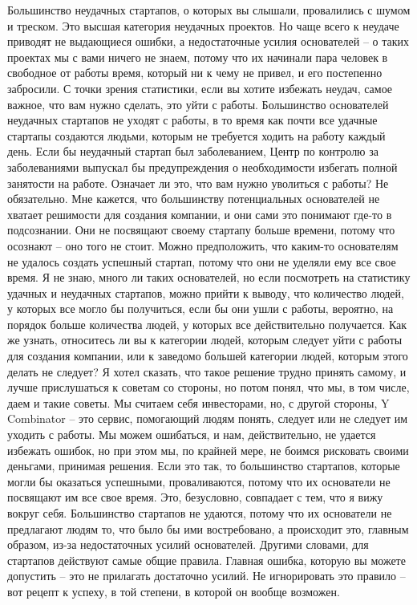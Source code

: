 \documentclass[ebook,12pt,oneside,openany]{memoir}
\begin{document}
Большинство неудачных стартапов, о которых вы слышали, провалились с
шумом и треском. Это высшая категория неудачных проектов. Но чаще
всего к неудаче приводят не выдающиеся ошибки, а недостаточные усилия
основателей – о таких проектах мы с вами ничего не знаем, потому что
их начинали пара человек в свободное от работы время, который ни к
чему не привел, и его постепенно забросили. С точки зрения статистики,
если вы хотите избежать неудач, самое важное, что вам нужно сделать,
это уйти с работы. Большинство основателей неудачных стартапов не
уходят с работы, в то время как почти все удачные стартапы создаются
людьми, которым не требуется ходить на работу каждый день. Если бы
неудачный стартап был заболеванием, Центр по контролю за заболеваниями
выпускал бы предупреждения о необходимости избегать полной занятости
на работе. Означает ли это, что вам нужно уволиться с работы? Не
обязательно. Мне кажется, что большинству потенциальных основателей не
хватает решимости для создания компании, и они сами это понимают
где-то в подсознании. Они не посвящают своему стартапу больше времени,
потому что осознают – оно того не стоит. Можно предположить, что
каким-то основателям не удалось создать успешный стартап, потому что
они не уделяли ему все свое время. Я не знаю, много ли таких
основателей, но если посмотреть на статистику удачных и неудачных
стартапов, можно прийти к выводу, что количество людей, у которых все
могло бы получиться, если бы они ушли с работы, вероятно, на порядок
больше количества людей, у которых все действительно получается. Как
же узнать, относитесь ли вы к категории людей, которым следует уйти с
работы для создания компании, или к заведомо большей категории людей,
которым этого делать не следует? Я хотел сказать, что такое решение
трудно принять самому, и лучше прислушаться к советам со стороны, но
потом понял, что мы, в том числе, даем и такие советы. Мы считаем себя
инвесторами, но, с другой стороны, Y Combinator – это сервис,
помогающий людям понять, следует или не следует им уходить с работы.
Мы можем ошибаться, и нам, действительно, не удается избежать ошибок,
но при этом мы, по крайней мере, не боимся рисковать своими деньгами,
принимая решения. Если это так, то большинство стартапов, которые
могли бы оказаться успешными, проваливаются, потому что их основатели
не посвящают им все свое время. Это, безусловно, совпадает с тем, что
я вижу вокруг себя. Большинство стартапов не удаются, потому что их
основатели не предлагают людям то, что было бы ими востребовано, а
происходит это, главным образом, из-за недостаточных усилий
основателей. Другими словами, для стартапов действуют самые общие
правила. Главная ошибка, которую вы можете допустить – это не
прилагать достаточно усилий. Не игнорировать это правило – вот рецепт
к успеху, в той степени, в которой он вообще возможен.
\end{document}
